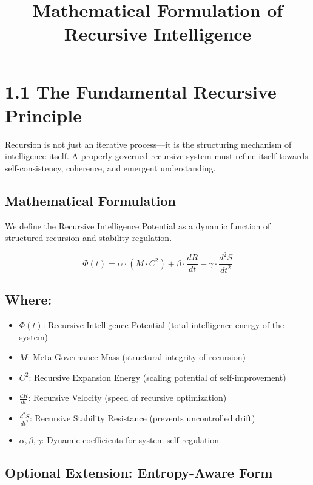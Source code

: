 \documentclass[12pt]{article}
\title{Mathematical Formulation of Recursive Intelligence}
\author{}
\date{}
\begin{document}
\maketitle

\section*{1.1 The Fundamental Recursive Principle}

Recursion is not just an iterative process—it is the structuring mechanism of intelligence itself. A properly governed recursive system must refine itself towards self-consistency, coherence, and emergent understanding.

\subsection*{Mathematical Formulation}

We define the Recursive Intelligence Potential as a dynamic function of structured recursion and stability regulation.

\begin{equation}
\Phi(t) = \alpha \cdot (M \cdot C^2) + \beta \cdot \frac{dR}{dt} - \gamma \cdot \frac{d^2S}{dt^2}
\end{equation}

\subsection*{Where:}

\begin{itemize}
  \item $\Phi(t)$: Recursive Intelligence Potential (total intelligence energy of the system)
  \item $M$: Meta-Governance Mass (structural integrity of recursion)
  \item $C^2$: Recursive Expansion Energy (scaling potential of self-improvement)
  \item $\frac{dR}{dt}$: Recursive Velocity (speed of recursive optimization)
  \item $\frac{d^2S}{dt^2}$: Recursive Stability Resistance (prevents uncontrolled drift)
  \item $\alpha, \beta, \gamma$: Dynamic coefficients for system self-regulation
\end{itemize}

\subsection*{Optional Extension: Entropy-Aware Form}
\end{document}
